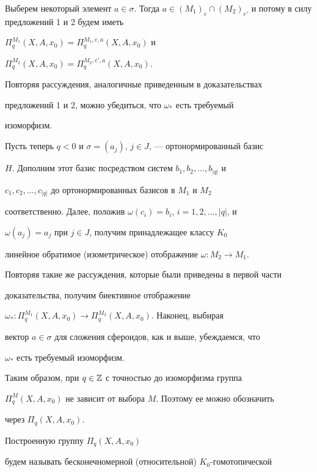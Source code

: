 \begin{pf}
Выберем некоторый элемент $a\in\sigma$. Тогда $a\in (M_1)_e\cap 


(M_2)_{e'}$ и потому в силу предложений 1 и 2 будем иметь 


$\Pi^{M_1}_q(X,A,x_0)=\Pi^{M_1,e,a}_q(X,A,x_0)$ и 


$\Pi^{M_2}_q(X,A,x_0)=\Pi^{M_2,e',a}_q(X,A,x_0)$. 


Повторяя рассуждения, аналогичные приведенным в доказательствах 


предложений 1 и 2, можно убедиться, что $\omega_*$ есть требуемый 


изоморфизм. 


 


Пусть теперь $q<0$ и $\sigma=(a_j)$, $j\in J$, --- ортонормированный базис 


$H$. Дополним этот базис посредством систем $b_1,b_2,\dotsc,b_{|q|}$ и 


$c_1,c_2,\dotsc,c_{|q|}$ до ортонормированных базисов в $M_1$ и $M_2$ 


соответственно. Далее, положив $\omega(c_i)=b_i$, $i=1,2,\dotsc,|q|$, и 


$\omega(a_j)=a_j$ при $j\in J$, получим принадлежащее классу $K_0$ 


линейное обратимое (изометрическое) отображение $\omega:M_2\to M_1$. 


Повторяя такие же рассуждения, которые были приведены в первой части 


доказательства, получим биективное отображение 


$\omega_*:\Pi^{M_1}_q(X,A,x_0)\to\Pi^{M_2}_q(X,A,x_0)$. Наконец, выбирая 


вектор $a\in\sigma$ для сложения сфероидов, как и выше, убеждаемся, что 


$\omega_*$ есть требуемый изоморфизм. 


\end{pf} 


 


Таким образом, при $q\in\Bbb Z$ с точностью до изоморфизма группа 


$\Pi^{M}_q(X,A,x_0)$ не зависит от выбора $M$. Поэтому ее можно обозначить 


через $\Pi_q(X,A,x_0)$. 


Построенную группу $\Pi_q(X,A,x_0)$ 


будем называть бесконечномерной (относительной) $K_0$-гомотопической 


